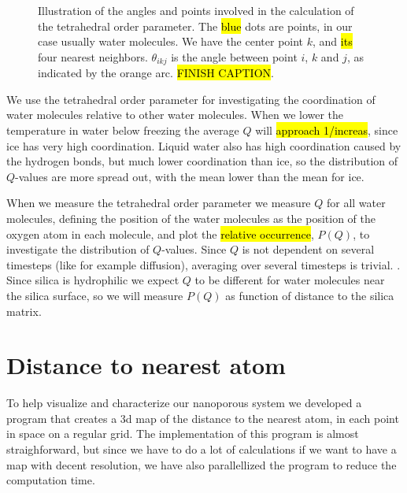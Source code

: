 %
\begin{figure}[htpb]%
    \centering%
    \caption{%
        Illustration of the angles and points involved in the calculation of the tetrahedral order parameter. The \hl{blue} dots are points, in our case usually water molecules. We have the center point $k$, and \hl{its} four nearest neighbors. $\theta_{ikj}$ is the angle between point $i$, $k$ and $j$, as indicated by the orange arc. \hl{FINISH CAPTION}. %
        \label{fig:top_tetrahedra}%
    }%
\end{figure}%

We use the tetrahedral order parameter for investigating the coordination of water molecules relative to other water molecules. When we lower the temperature in water below freezing the average $Q$ will \hl{approach 1/increas}, since ice has very high coordination. Liquid water also has high coordination caused by the hydrogen bonds, but much lower coordination than ice, so the distribution of $Q$-values are more spread out, with the mean lower than the mean for ice.

When we measure the tetrahedral order parameter we measure $Q$ for all water molecules, defining the position of the water molecules as the position of the oxygen atom in each molecule, and plot the \hl{relative occurrence}, $P(Q)$, to investigate the distribution of $Q$-values. Since $Q$ is not dependent on several timesteps (like for example diffusion), averaging over several timesteps is trivial. . Since silica is hydrophilic we expect $Q$ to be different for water molecules near the silica surface, so we will measure $P(Q)$ as function of distance to the silica matrix.


\section{Distance to nearest atom\label{sec:distance_to_atom}}
To help visualize and characterize our nanoporous system we developed a program that creates a 3d map of the distance to the nearest atom, in each point in space on a regular grid. The implementation of this program is almost straighforward, but since we have to do a lot of calculations if we want to have a map with decent resolution, we have also parallellized the program to reduce the computation time.

